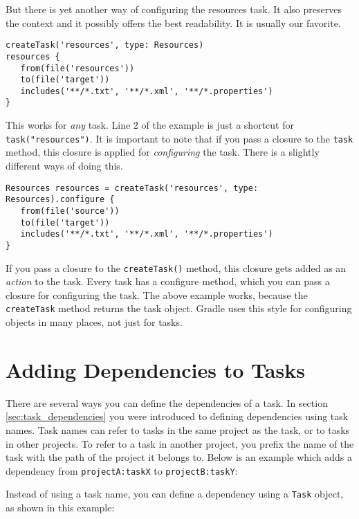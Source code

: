 But there is yet another way of configuring the resources task. It also preserves the context and it possibly offers the best readability. It is usually our favorite.
\begin{Verbatim}
createTask('resources', type: Resources)
resources {
   from(file('resources'))
   to(file('target'))
   includes('**/*.txt', '**/*.xml', '**/*.properties')
}
\end{Verbatim}
This works for \emph{any} task. Line 2 of the example is just a shortcut for \texttt{task("resources")}. It is important to note that if you pass a closure to the \texttt{task} method, this closure is applied for \emph{configuring} the task. There is a slightly different ways of doing this.
\begin{Verbatim}
Resources resources = createTask('resources', type: Resources).configure {
   from(file('source'))
   to(file('target'))
   includes('**/*.txt', '**/*.xml', '**/*.properties')
}	
\end{Verbatim}
If you pass a closure to the \texttt{createTask()} method, this closure gets added as an \emph{action} to the task. Every task has a configure method, which you can pass a closure for configuring the task. The above example works, because the \texttt{createTask} method returns the task object. Gradle uses this style for configuring objects in many places, not just for tasks.

\section{Adding Dependencies to Tasks}
\label{sec:adding_dependencies_to_tasks}
There are several ways you can define the dependencies of a task. In section \ref{sec:task_dependencies} you were
introduced to defining dependencies using task names. Task names can refer to tasks in the same project as the task, or
to tasks in other projects. To refer to a task in another project, you prefix the name of the task with the path of the
project it belongs to. Below is an example which adds a dependency from \texttt{projectA:taskX} to
\texttt{projectB:taskY}:

Instead of using a task name, you can define a dependency using a \texttt{Task} object, as shown in this example:

